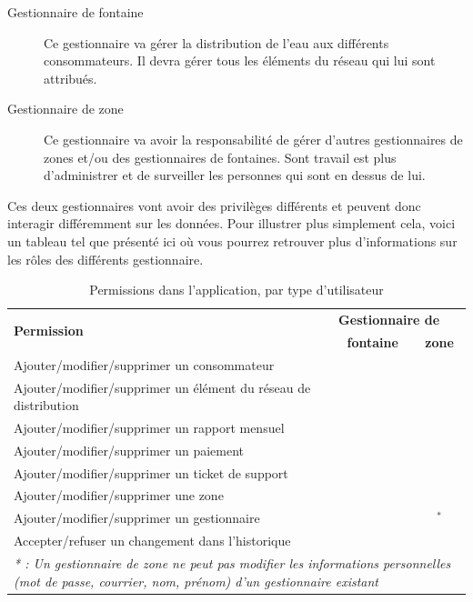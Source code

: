 \documentclass{EPL-master-thesis-covers-FR}
\newcommand{\cmark}{\ding{51}}%
\newcommand{\xmark}{\ding{55}}%
\begin{document}
				\begin{description}
					\item[Gestionnaire de fontaine] Ce gestionnaire va gérer la distribution de l'eau aux différents consommateurs. Il devra gérer tous les éléments du réseau qui lui sont attribués.
					\item[Gestionnaire de zone] Ce gestionnaire va avoir la responsabilité de gérer d'autres gestionnaires de zones et/ou des gestionnaires de fontaines. Sont travail est plus d'administrer et de surveiller les personnes qui sont en dessus de lui.			 
				\end{description}
				
				Ces deux gestionnaires vont avoir des privilèges différents et peuvent donc interagir différemment sur les données. Pour illustrer plus simplement cela, voici un tableau tel que présenté ici \cite{ref:haitiwater} où vous pourrez retrouver plus d'informations sur les rôles des différents gestionnaire. 
				\begin{table}[H]
					\centering
					\small
					\setlength\tabcolsep{2pt}
					\begin{tabular}{|l|c|c|}
						\hline
						\multirow{2}{*}{\textbf{Permission}} & \multicolumn{2}{l|}{\textbf{Gestionnaire de}} \\ \cline{2-3}
						 & \textbf{fontaine} & \textbf{zone} \\ \hline
						 Ajouter/modifier/supprimer un consommateur & \cmark & \cmark \\ \hline
						 Ajouter/modifier/supprimer un élément du réseau de distribution & \cmark & \cmark \\ \hline
						 Ajouter/modifier/supprimer un rapport mensuel & \cmark & \cmark \\ \hline
						 Ajouter/modifier/supprimer un paiement & \cmark & \cmark \\ \hline
						 Ajouter/modifier/supprimer un ticket de support & \cmark & \cmark \\ \hline
						 Ajouter/modifier/supprimer une zone & \xmark & \cmark \\ \hline
						 Ajouter/modifier/supprimer un gestionnaire & \xmark & \cmark$^{*}$ \\ \hline
						 Accepter/refuser un changement dans l'historique & \xmark & \cmark \\ \hline
						 \multicolumn{3}{p{\textwidth}}{\emph{* : Un gestionnaire de zone ne peut pas modifier les informations personnelles (mot de passe, courrier, nom, prénom) d'un gestionnaire existant}} \\
					\end{tabular}
					\caption{Permissions dans l'application, par type d'utilisateur}
					\label{tab:permissions}
				\end{table}
				
\end{document}
